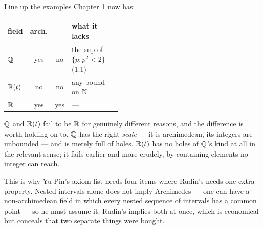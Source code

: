 \begin{deeper}
Line up the examples Chapter 1 now has:

\smallskip
\begin{tabular}{@{}l c c p{0.44\linewidth}@{}}
\toprule
\textbf{field} & \textbf{arch.} & \textbf{\lub{}} & \textbf{what it lacks} \\
\midrule
$\mathbb{Q}$      & yes & no  & the sup of $\{p : p^2<2\}$ (1.1) \\
$\mathbb{R}(t)$   & no  & no  & any bound on $\mathbb{N}$ \\
$\mathbb{R}$      & yes & yes & --- \\
\bottomrule
\end{tabular}

\smallskip
$\mathbb{Q}$ and $\mathbb{R}(t)$ fail to be $\mathbb{R}$ for genuinely different reasons, and the
difference is worth holding on to. $\mathbb{Q}$ has the right \emph{scale} --- it is
archimedean, its integers are unbounded --- and is merely full of holes.
$\mathbb{R}(t)$ has no holes of $\mathbb{Q}$'s kind at all in the relevant sense; it fails
earlier and more crudely, by containing elements no integer can reach.

This is why Yu Pin's axiom list needs four items where Rudin's needs one
extra property. Nested intervals alone does not imply Archimedes --- one can
have a non-archimedean field in which every nested sequence of intervals has
a common point --- so he must assume it. Rudin's \lub{} implies both at once,
which is economical but conceals that two separate things were bought.
\end{deeper}


